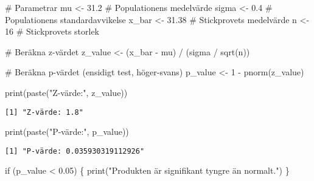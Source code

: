 \documentclass[
  letterpaper,
  DIV=11,
  numbers=noendperiod]{scrartcl}
\newenvironment{Shaded}{\begin{snugshade}}{\end{snugshade}}
\newcommand{\CommentTok}[1]{\textcolor[rgb]{0.37,0.37,0.37}{#1}}
\newcommand{\ControlFlowTok}[1]{\textcolor[rgb]{0.00,0.23,0.31}{#1}}
\newcommand{\DecValTok}[1]{\textcolor[rgb]{0.68,0.00,0.00}{#1}}
\newcommand{\FloatTok}[1]{\textcolor[rgb]{0.68,0.00,0.00}{#1}}
\newcommand{\FunctionTok}[1]{\textcolor[rgb]{0.28,0.35,0.67}{#1}}
\newcommand{\NormalTok}[1]{\textcolor[rgb]{0.00,0.23,0.31}{#1}}
\newcommand{\OtherTok}[1]{\textcolor[rgb]{0.00,0.23,0.31}{#1}}
\newcommand{\SpecialCharTok}[1]{\textcolor[rgb]{0.37,0.37,0.37}{#1}}
\newcommand{\StringTok}[1]{\textcolor[rgb]{0.13,0.47,0.30}{#1}}
\begin{document}
\begin{Shaded}
\begin{Highlighting}[]
\CommentTok{\# Parametrar}
\NormalTok{mu }\OtherTok{\textless{}{-}} \FloatTok{31.2}          \CommentTok{\# Populationens medelvärde}
\NormalTok{sigma }\OtherTok{\textless{}{-}} \FloatTok{0.4}        \CommentTok{\# Populationens standardavvikelse}
\NormalTok{x\_bar }\OtherTok{\textless{}{-}} \FloatTok{31.38}      \CommentTok{\# Stickprovets medelvärde}
\NormalTok{n }\OtherTok{\textless{}{-}} \DecValTok{16}             \CommentTok{\# Stickprovets storlek}

\CommentTok{\# Beräkna z{-}värdet}
\NormalTok{z\_value }\OtherTok{\textless{}{-}}\NormalTok{ (x\_bar }\SpecialCharTok{{-}}\NormalTok{ mu) }\SpecialCharTok{/}\NormalTok{ (sigma }\SpecialCharTok{/} \FunctionTok{sqrt}\NormalTok{(n))}

\CommentTok{\# Beräkna p{-}värdet (ensidigt test, höger{-}svans)}
\NormalTok{p\_value }\OtherTok{\textless{}{-}} \DecValTok{1} \SpecialCharTok{{-}} \FunctionTok{pnorm}\NormalTok{(z\_value)}

\FunctionTok{print}\NormalTok{(}\FunctionTok{paste}\NormalTok{(}\StringTok{"Z{-}värde:"}\NormalTok{, z\_value))}
\end{Highlighting}
\end{Shaded}

\begin{verbatim}
[1] "Z-värde: 1.8"
\end{verbatim}

\begin{Shaded}
\begin{Highlighting}[]
\FunctionTok{print}\NormalTok{(}\FunctionTok{paste}\NormalTok{(}\StringTok{"P{-}värde:"}\NormalTok{, p\_value))}
\end{Highlighting}
\end{Shaded}

\begin{verbatim}
[1] "P-värde: 0.035930319112926"
\end{verbatim}

\begin{Shaded}
\begin{Highlighting}[]
\ControlFlowTok{if}\NormalTok{ (p\_value }\SpecialCharTok{\textless{}} \FloatTok{0.05}\NormalTok{) \{}
  \FunctionTok{print}\NormalTok{(}\StringTok{"Produkten är signifikant tyngre än normalt."}\NormalTok{)}
\NormalTok{\}}
\end{Highlighting}
\end{Shaded}
\end{document}
